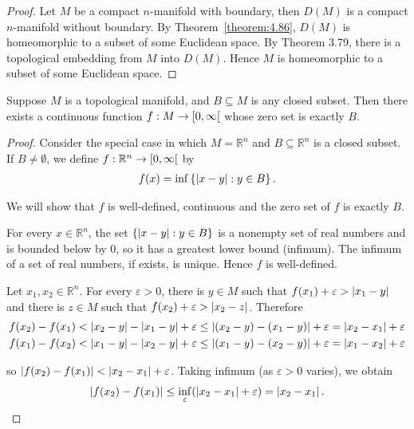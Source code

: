 \begin{proof}
	Let $M$ be a compact $n$-manifold with boundary, then $D(M)$ is a compact $n$-manifold without boundary. By Theorem~\ref{theorem:4.86}, $D(M)$ is homeomorphic to a subset of some Euclidean space. By Theorem 3.79, there is a topological embedding from $M$ into $D(M)$. Hence $M$ is homeomorphic to a subset of some Euclidean space.
\end{proof}

\begin{theorem}{4.88}\label{theorem:4.88}
	Suppose $M$ is a topological manifold, and $B\subseteq M$ is any closed subset. Then there exists a continuous function $f: M \to \left[{0, \infty}\right[$ whose zero set is exactly $B$.
\end{theorem}

\begin{proof}
	Consider the special case in which $M = \mathbb{R}^{n}$ and $B\subseteq \mathbb{R}^{n}$ is a closed subset. If $B\ne \emptyset$, we define $f: \mathbb{R}^{n} \to \left[{0, \infty}\right[$ by
	\begin{align*}
		f(x) = \inf\left\{{ \left\vert{x - y}\right\vert : y\in B }\right\}.
	\end{align*}

	We will show that $f$ is well-defined, continuous and the zero set of $f$ is exactly $B$.

	For every $x\in \mathbb{R}^{n}$, the set $\left\{{ \left\vert{x - y}\right\vert: y\in B }\right\}$ is a nonempty set of real numbers and is bounded below by 0, so it has a greatest lower bound (infimum). The infimum of a set of real numbers, if exists, is unique. Hence $f$ is well-defined.

	Let $x_{1}, x_{2}\in \mathbb{R}^{n}$. For every $\varepsilon > 0$, there is $y\in M$ such that $f(x_{1}) + \varepsilon > \left\vert{x_{1} - y}\right\vert$ and there is $z\in M$ such that $f(x_{2}) + \varepsilon > \left\vert{x_{2} - z}\right\vert$. Therefore
	\begin{align*}
		 & f(x_{2}) - f(x_{1}) < \left\vert{x_{2} - y}\right\vert - \left\vert{x_{1} - y}\right\vert + \varepsilon \leq \left\vert{(x_{2} - y) - (x_{1} - y)}\right\vert + \varepsilon = \left\vert{x_{2} - x_{1}}\right\vert + \varepsilon \\
		 & f(x_{1}) - f(x_{2}) < \left\vert{x_{1} - y}\right\vert - \left\vert{x_{2} - y}\right\vert + \varepsilon \leq \left\vert{(x_{1} - y) - (x_{2} - y)}\right\vert + \varepsilon = \left\vert{x_{1} - x_{2}}\right\vert + \varepsilon
	\end{align*}

	so $\left\vert{f(x_{2}) - f(x_{1})}\right\vert < \left\vert{x_{2} - x_{1}}\right\vert + \varepsilon$. Taking infimum (as $\varepsilon > 0$ varies), we obtain
	\begin{align*}
		\left\vert{f(x_{2}) - f(x_{1})}\right\vert \leq \inf\limits_{\varepsilon} (\left\vert{x_{2} - x_{1}}\right\vert + \varepsilon) = \left\vert{x_{2} - x_{1}}\right\vert.
	\end{align*}


\end{proof}
